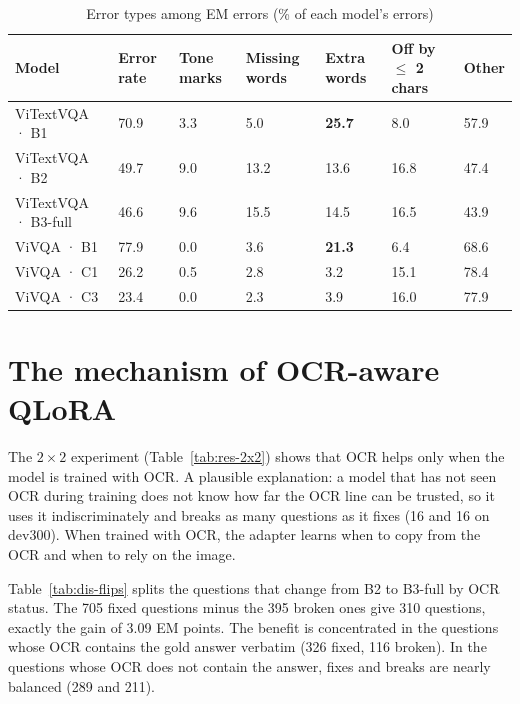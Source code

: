 \begin{table}[htbp]
\caption{Error types among EM errors (\% of each model's errors)}
\label{tab:dis-buckets}
\centering
\small
\begin{tabular}{p{}p{}p{}p{}p{}p{}p{}}
\toprule
\textbf{Model} & \textbf{Error rate} & \textbf{Tone marks} & \textbf{Missing words} & \textbf{Extra words} & \textbf{Off by $\leq$ 2 chars} & \textbf{Other} \\
\midrule
ViTextVQA · B1 & 70.9 & 3.3 & 5.0 & \textbf{25.7} & 8.0 & 57.9 \\
ViTextVQA · B2 & 49.7 & 9.0 & 13.2 & 13.6 & 16.8 & 47.4 \\
ViTextVQA · B3-full & 46.6 & 9.6 & 15.5 & 14.5 & 16.5 & 43.9 \\
\midrule
ViVQA · B1 & 77.9 & 0.0 & 3.6 & \textbf{21.3} & 6.4 & 68.6 \\
ViVQA · C1 & 26.2 & 0.5 & 2.8 & 3.2 & 15.1 & 78.4 \\
ViVQA · C3 & 23.4 & 0.0 & 2.3 & 3.9 & 16.0 & 77.9 \\
\bottomrule
\end{tabular}
\end{table}

\section{The mechanism of OCR-aware QLoRA}
\label{sec:dis-ocr}

The $2\times2$ experiment (Table~\ref{tab:res-2x2}) shows that OCR helps only when the model
is trained with OCR. A plausible explanation: a model that has not seen OCR during training
does not know how far the OCR line can be trusted, so it uses it indiscriminately and breaks
as many questions as it fixes (16 and 16 on dev300). When trained with OCR, the adapter
learns when to copy from the OCR and when to rely on the image.

Table~\ref{tab:dis-flips} splits the questions that change from B2 to B3-full by OCR
status. The 705 fixed questions minus the 395 broken ones give 310 questions, exactly the
gain of 3.09 EM points. The benefit is concentrated in the questions whose OCR contains the
gold answer verbatim (326 fixed, 116 broken). In the questions whose OCR does not contain
the answer, fixes and breaks are nearly balanced (289 and 211).

